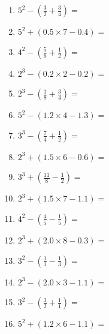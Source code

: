 \documentclass[12pt]{article}
\begin{document}
\begin{enumerate}
\item \large $ 5^{2} - (\frac{3}{2} + \frac{3}{4}) = $ \vspace{1.6cm}
\item \large $ 5^{2} + (0.5 \times 7 - 0.4) = $ \vspace{1.6cm}
\item \large $ 4^{2} - (\frac{5}{6} + \frac{1}{2}) = $ \vspace{1.6cm}
\item \large $ 2^{3} - (0.2 \times 2 - 0.2) = $ \vspace{1.6cm}
\item \large $ 2^{3} - (\frac{1}{8} + \frac{3}{4}) = $ \vspace{1.6cm}
\item \large $ 5^{2} - (1.2 \times 4 - 1.3) = $ \vspace{1.6cm}
\newpage
\item \large $ 3^{3} - (\frac{7}{4} + \frac{1}{2}) = $ \vspace{1.6cm}
\item \large $ 2^{3} + (1.5 \times 6 - 0.6) = $ \vspace{1.6cm}
\item \large $ 3^{3} + (\frac{11}{8} - \frac{1}{2}) = $ \vspace{1.6cm}
\item \large $ 2^{3} + (1.5 \times 7 - 1.1) = $ \vspace{1.6cm}
\item \large $ 4^{2} - (\frac{4}{5} - \frac{1}{5}) = $ \vspace{1.6cm}
\item \large $ 2^{3} + (2.0 \times 8 - 0.3) = $ \vspace{1.6cm}
\item \large $ 3^{2} - (\frac{1}{1} - \frac{1}{3}) = $ \vspace{1.6cm}
\item \large $ 2^{3} - (2.0 \times 3 - 1.1) = $ \vspace{1.6cm}
\item \large $ 3^{2} - (\frac{3}{2} + \frac{1}{1}) = $ \vspace{1.6cm}
\item \large $ 5^{2} + (1.2 \times 6 - 1.1) = $ \vspace{1.6cm}
\end{enumerate}\newpage
\end{document}
